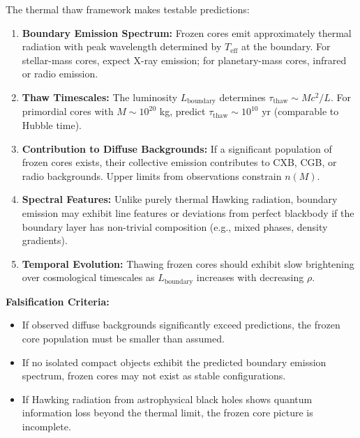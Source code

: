 \documentclass[11pt,a4paper]{article}
\newcommand{\Teff}{\ensuremath{T_{\mathrm{eff}}}}
\theoremstyle{definition}
\theoremstyle{remark}
\begin{document}
The thermal thaw framework makes testable predictions:

\begin{enumerate}[leftmargin=*, itemsep=0.3em]
\item \textbf{Boundary Emission Spectrum:} Frozen cores emit approximately thermal radiation with peak wavelength determined by $\Teff$ at the boundary. For stellar-mass cores, expect X-ray emission; for planetary-mass cores, infrared or radio emission.

\item \textbf{Thaw Timescales:} The luminosity $L_{\mathrm{boundary}}$ determines $\tau_{\mathrm{thaw}} \sim Mc^2/L$. For primordial cores with $M \sim 10^{20}$ kg, predict $\tau_{\mathrm{thaw}} \sim 10^{10}$ yr (comparable to Hubble time).

\item \textbf{Contribution to Diffuse Backgrounds:} If a significant population of frozen cores exists, their collective emission contributes to CXB, CGB, or radio backgrounds. Upper limits from observations constrain $n(M)$.

\item \textbf{Spectral Features:} Unlike purely thermal Hawking radiation, boundary emission may exhibit line features or deviations from perfect blackbody if the boundary layer has non-trivial composition (e.g., mixed phases, density gradients).

\item \textbf{Temporal Evolution:} Thawing frozen cores should exhibit slow brightening over cosmological timescales as $L_{\mathrm{boundary}}$ increases with decreasing $\rho$.
\end{enumerate}

\vspace{0.5em}
\noindent
\textbf{Falsification Criteria:}
\begin{itemize}[leftmargin=*, itemsep=0.3em]
\item If observed diffuse backgrounds significantly exceed predictions, the frozen core population must be smaller than assumed.
\item If no isolated compact objects exhibit the predicted boundary emission spectrum, frozen cores may not exist as stable configurations.
\item If Hawking radiation from astrophysical black holes shows quantum information loss beyond the thermal limit, the frozen core picture is incomplete.
\end{itemize}
\end{document}
